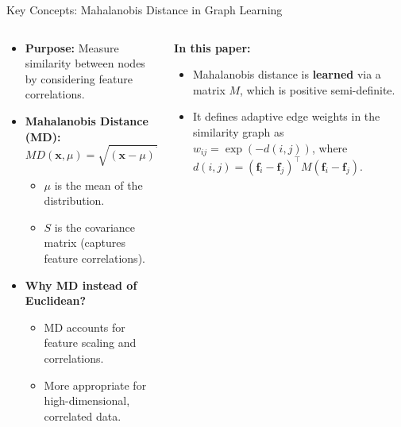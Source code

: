 \documentclass[aspectratio=169,xcolor=dvipsnames]{beamer}
\begin{document}
\begin{frame}{Key Concepts: Mahalanobis Distance in Graph Learning}

\begin{columns}[c]

\begin{column}{0.45\textwidth}

\begin{itemize}
    \item \textbf{Purpose:} Measure similarity between nodes by considering feature correlations.
    
    
    \item \textbf{Mahalanobis Distance (MD):}
    \[
        MD(\mathbf{x}, \mu) = \sqrt{(\mathbf{x} - \mu)^\top S^{-1} (\mathbf{x} - \mu)}
    \]
    \vspace{-0.4cm}
    \begin{itemize}
        \item $\mu$ is the mean of the distribution.
        \item $S$ is the covariance matrix (captures feature correlations).
    \end{itemize}
    
    
    \item \textbf{Why MD instead of Euclidean?}
    \begin{itemize}
        \item MD accounts for feature scaling and correlations.
        \item More appropriate for high-dimensional, correlated data.
    \end{itemize}

\end{itemize}

\end{column}

\begin{column}{0.55\textwidth}


\textbf{In this paper:}
\begin{itemize}
    \item Mahalanobis distance is \textbf{learned} via a matrix $M$, which is positive semi-definite.
    
    
    \item It defines adaptive edge weights in the similarity graph as  
    $w_{ij} = \exp(-d(i,j))$,  
    where $d(i,j) = (\mathbf{f}_i - \mathbf{f}_j)^\top M (\mathbf{f}_i - \mathbf{f}_j)$.
    

\end{itemize}
\end{column}
\end{columns}
\end{frame}
\end{document}
